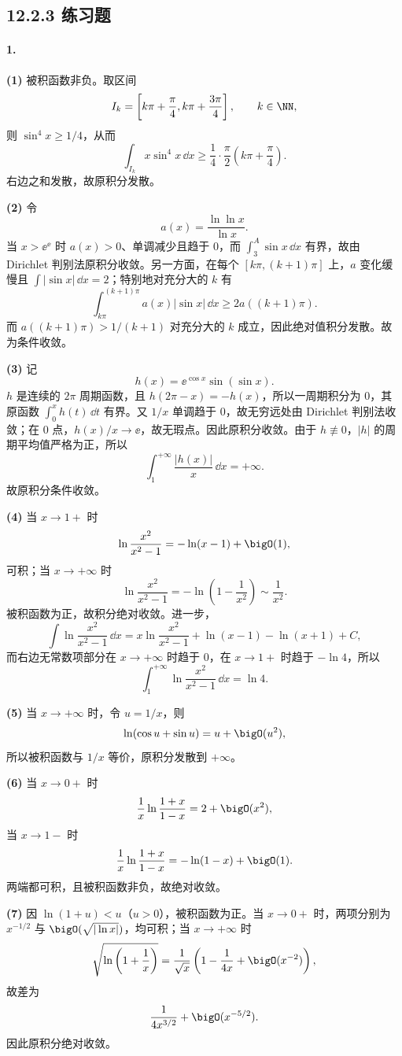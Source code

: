 \subsection*{12.2.3 练习题}

\paragraph{1.}
\textbf{(1)} 被积函数非负。取区间
\[
  I_k=\left[k\pi+\frac\pi4,k\pi+\frac{3\pi}4\right],\qquad k\in\NN,
\]
则 $\sin^4x\geq1/4$，从而
\[
  \int_{I_k}x\sin^4x\,\dd x\geq\frac14\cdot\frac\pi2\left(k\pi+\frac\pi4\right).
\]
右边之和发散，故原积分发散。

\textbf{(2)} 令
\[
  a(x)=\frac{\ln\ln x}{\ln x}.
\]
当 $x>\ee^{\ee}$ 时 $a(x)>0$、单调减少且趋于 $0$，而 $\int_3^A\sin x\,\dd x$ 有界，故由 Dirichlet 判别法原积分收敛。另一方面，在每个 $[k\pi,(k+1)\pi]$ 上，$a$ 变化缓慢且 $\int|\sin x|\,\dd x=2$；特别地对充分大的 $k$ 有
\[
  \int_{k\pi}^{(k+1)\pi}a(x)|\sin x|\,\dd x
  \geq 2a((k+1)\pi).
\]
而 $a((k+1)\pi)>1/(k+1)$ 对充分大的 $k$ 成立，因此绝对值积分发散。故为条件收敛。

\textbf{(3)} 记
\[
  h(x)=\ee^{\cos x}\sin(\sin x).
\]
$h$ 是连续的 $2\pi$ 周期函数，且 $h(2\pi-x)=-h(x)$，所以一周期积分为 $0$，其原函数 $\int_0^x h(t)\,\dd t$ 有界。又 $1/x$ 单调趋于 $0$，故无穷远处由 Dirichlet 判别法收敛；在 $0$ 点，$h(x)/x\to\ee$，故无瑕点。因此原积分收敛。由于 $h\not\equiv0$，$|h|$ 的周期平均值严格为正，所以
\[
  \int_1^{+\infty}\frac{|h(x)|}{x}\,\dd x=+\infty.
\]
故原积分条件收敛。

\textbf{(4)} 当 $x\to1+$ 时
\[
  \ln\frac{x^2}{x^2-1}=-\ln(x-1)+\bigO(1),
\]
可积；当 $x\to+\infty$ 时
\[
  \ln\frac{x^2}{x^2-1}=-\ln\left(1-\frac1{x^2}\right)
  \sim\frac1{x^2}.
\]
被积函数为正，故积分绝对收敛。进一步，
\[
  \int \ln\frac{x^2}{x^2-1}\,\dd x
  =x\ln\frac{x^2}{x^2-1}+\ln(x-1)-\ln(x+1)+C,
\]
而右边无常数项部分在 $x\to+\infty$ 时趋于 $0$，在 $x\to1+$ 时趋于 $-\ln4$，所以
\[
  \int_1^{+\infty}\ln\frac{x^2}{x^2-1}\,\dd x=\boxed{\ln4}.
\]

\textbf{(5)} 当 $x\to+\infty$ 时，令 $u=1/x$，则
\[
  \ln(\cos u+\sin u)=u+\bigO(u^2),
\]
所以被积函数与 $1/x$ 等价，原积分发散到 $+\infty$。

\textbf{(6)} 当 $x\to0+$ 时
\[
  \frac1x\ln\frac{1+x}{1-x}=2+\bigO(x^2),
\]
当 $x\to1-$ 时
\[
  \frac1x\ln\frac{1+x}{1-x}=-\ln(1-x)+\bigO(1).
\]
两端都可积，且被积函数非负，故绝对收敛。

\textbf{(7)} 因 $\ln(1+u)<u$（$u>0$），被积函数为正。当 $x\to0+$ 时，两项分别为 $x^{-1/2}$ 与 $\bigO(\sqrt{|\ln x|})$，均可积；当 $x\to+\infty$ 时
\[
  \sqrt{\ln\left(1+\frac1x\right)}
  =\frac1{\sqrt x}\left(1-\frac1{4x}+\bigO(x^{-2})\right),
\]
故差为
\[
  \frac1{4x^{3/2}}+\bigO(x^{-5/2}).
\]
因此原积分绝对收敛。

